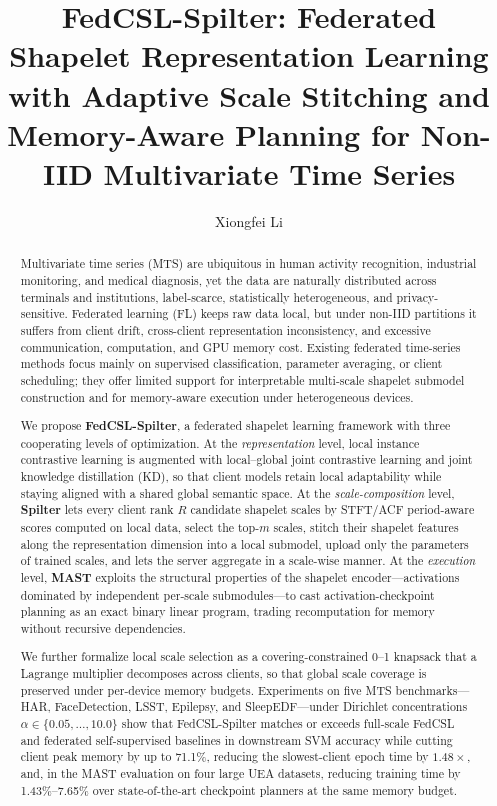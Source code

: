 \documentclass[sigconf]{acmart}
\begin{document}
\title[FedCSL-Spilter]{FedCSL-Spilter: Federated Shapelet Representation Learning
with Adaptive Scale Stitching and Memory-Aware Planning for Non-IID
Multivariate Time Series}

\author{Xiongfei Li}

\renewcommand{\shortauthors}{Li}

\begin{abstract}
Multivariate time series (MTS) are ubiquitous in human activity recognition,
industrial monitoring, and medical diagnosis, yet the data are naturally
distributed across terminals and institutions, label-scarce, statistically
heterogeneous, and privacy-sensitive. Federated learning (FL) keeps raw data
local, but under non-IID partitions it suffers from client drift, cross-client
representation inconsistency, and excessive communication, computation, and GPU
memory cost. Existing federated time-series methods focus mainly on supervised
classification, parameter averaging, or client scheduling; they offer limited
support for interpretable multi-scale shapelet submodel construction and for
memory-aware execution under heterogeneous devices.

We propose \textbf{FedCSL-Spilter}, a federated shapelet learning framework
with three cooperating levels of optimization. At the \emph{representation}
level, local instance contrastive learning is augmented with local--global joint
contrastive learning and joint knowledge distillation (KD), so that client models
retain local adaptability while staying aligned with a shared global semantic
space. At the \emph{scale-composition} level, \textbf{Spilter} lets every client
rank $R$ candidate shapelet scales by STFT/ACF period-aware scores computed on
local data, select the top-$m$ scales, stitch their shapelet features along the
representation dimension into a local submodel, upload only the parameters of
trained scales, and lets the server aggregate in a scale-wise manner. At the
\emph{execution} level, \textbf{MAST} exploits the structural properties of the
shapelet encoder---activations dominated by independent per-scale
submodules---to cast activation-checkpoint planning as an exact binary linear
program, trading recomputation for memory without recursive dependencies.

We further formalize local scale selection as a covering-constrained 0--1
knapsack that a Lagrange multiplier decomposes across clients, so that global
scale coverage is preserved under per-device memory budgets. Experiments on five
MTS benchmarks---HAR, FaceDetection, LSST, Epilepsy, and SleepEDF---under
Dirichlet concentrations $\alpha\in\{0.05,\dots,10.0\}$ show that FedCSL-Spilter
matches or exceeds full-scale FedCSL and federated self-supervised baselines in
downstream SVM accuracy while cutting client peak memory by up to 71.1\%,
reducing the slowest-client epoch time by $1.48\times$, and, in the MAST
evaluation on four large UEA datasets, reducing training time by
1.43\%--7.65\% over state-of-the-art checkpoint planners at the same memory
budget.
\end{abstract}
\end{document}
